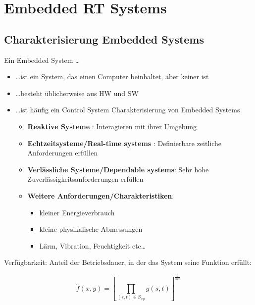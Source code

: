 \section{Embedded RT Systems }
\subsection{Charakterisierung Embedded Systems }
Ein Embedded System \ldots
\begin{itemize}
  \item \ldots ist ein System, das einen Computer beinhaltet, aber keiner ist
  \item \ldots besteht üblicherweise aus HW und SW
  \item \ldots ist häufig ein Control System
Charakterisierung von Embedded Systems
  \begin{itemize}
    \item \textbf{Reaktive Systeme} : Interagieren mit ihrer Umgebung
    \item \textbf{Echtzeitsysteme/Real-time systems} : Definierbare zeitliche
    Anforderungen erfüllen
    \item \textbf{Verlässliche Systeme/Dependable systems}: Sehr hohe
    Zuverlässigkeitsanforderungen erfüllen
    \item \textbf{Weitere Anforderungen/Charakteristiken}: 
    \begin{itemize}
      \item kleiner Energieverbrauch
      \item kleine physikalische Abmessungen
      \item Lärm, Vibration, Feuchtigkeit etc\ldots
    \end{itemize}
  \end{itemize}
\end{itemize}

Verfügbarkeit: Anteil der Betriebsdauer, in  der das System seine Funktion
erfüllt: 

\begin{equation}
	\hat{f}(x,y)= \left[\prod\limits_{(s,t)\in S_{xy}} g(s,t)\right]^\frac{1}{mn}
\end{equation}
